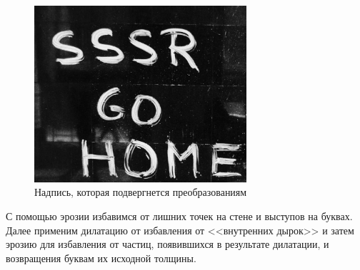 \begin{figure}[ht!]
    \centering
    \includegraphics[width=0.7\textwidth]{images/transformed_images/1/Caption.jpg}
    \caption{Надпись, которая подвергнется преобразованиям}
    \label{img:Caption_orig}
\end{figure} 

С помощью эрозии избавимся от лишних точек на стене и выступов на буквах. Далее применим дилатацию от избавления от <<внутренних дырок>> и затем эрозию для избавления от частиц, появившихся в результате дилатации, и возвращения буквам их исходной толщины.

